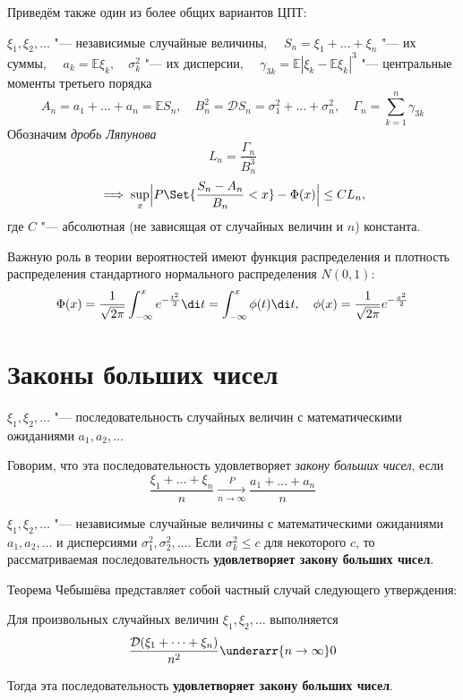 Приведём также один из более общих вариантов ЦПТ:
\begin{theorem}[Ляпунова]
    $ \xi_1, \xi_2, \dotsc $ "--- независимые случайные величины, $ \quad
    S_n = \xi_1 + \dots + \xi_n $ "--- их суммы, $ \quad a_k = \mathbb E \xi_k, \quad
    \sigma_k^2 $ "--- их дисперсии, $ \quad \gamma_{3k} = \mathbb E |\xi_k -
    \mathbb E \xi_k|^3 $ "--- центральные моменты третьего порядка
    $$ A_n = a_1 + \dots + a_n = \mathbb E S_n, \quad
    B_n^2 = \mathcal D S_n = \sigma_1^2 + \dots + \sigma_n^2, \quad
    \Gamma_n = \sum_{k = 1}^n \gamma_{3k} $$
    Обозначим \emph{дробь Ляпунова}
    $$ L_n = \frac{\Gamma_n}{B_n^3} $$
    $$ \implies \sup\limits_x \Bigl| P\Set{\frac{S_n - A_n}{B_n} < x} - \Phi(x) \Bigr| \le CL_n, $$
    где $ C $ "--- абсолютная (не зависящая от случайных величин и $ n $) константа.
\end{theorem}

Важную роль в теории вероятностей имеют функция распределения и плотность распределения
стандартного нормального распределения $ N(0, 1) $:
$$ \Phi(x) = \frac1{\sqrt{2\pi}} \int_{-\infty}^x e^{-\frac{t^2}2}\di t =
\int_{-\infty}^x \phi(t) \di t, \quad \phi(x) = \frac1{\sqrt{2\pi}} e^{-\frac{x^2}2} $$

\section{Законы больших чисел}

\begin{definition}
    $ \xi_1, \xi_2, \dotsc $ "--- последовательность случайных величин с математическими
    ожиданиями $ a_1, a_2, \dotsc $

    Говорим, что эта последовательность удовлетворяет \emph{закону больших чисел}, если
    $$ \frac{\xi_1 + \dots + \xi_n}n \xrightarrow[n \to \infty]{P} \frac{a_1 + \dots + a_n}n $$
\end{definition}

\begin{theorem}[Чебышёва]
    $ \xi_1, \xi_2, \dotsc $ "--- независимые случайные величины с математическими ожиданиями
    $ a_1, a_2, \dotsc $ и дисперсиями $ \sigma_1^2, \sigma_2^2, \dotsc $.
    Если $ \sigma_k^2 \le c $ для некоторого $ c $, то рассматриваемая последовательность
    \textbf{удовлетворяет закону больших чисел}.
\end{theorem}

Теорема Чебышёва представляет собой частный случай следующего утверждения:
\begin{theorem}[Маркова]
    Для произвольных случайных величин $ \xi_1, \xi_2, \dotsc $ выполняется
    $$ \frac{\mathcal D(\xi_1 + \dots + \xi_n)}{n^2} \underarr{n \to \infty} 0 $$

    Тогда эта последовательность \textbf{удовлетворяет закону больших чисел}.
\end{theorem}


